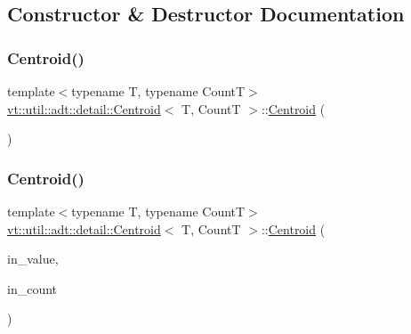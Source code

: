 \subsection{Constructor \& Destructor Documentation}
\mbox{\label{structvt_1_1util_1_1adt_1_1detail_1_1_centroid_a566041829c6432cb574dec14a7686141}} 
\subsubsection{\texorpdfstring{Centroid()}{Centroid()}\hspace{0.1cm}{\footnotesize\ttfamily [1/2]}}
{\footnotesize\ttfamily template$<$typename T, typename CountT$>$ \\
\hyperlink{structvt_1_1util_1_1adt_1_1detail_1_1_centroid}{vt\+::util\+::adt\+::detail\+::\+Centroid}$<$ T, CountT $>$\+::\hyperlink{structvt_1_1util_1_1adt_1_1detail_1_1_centroid}{Centroid} (\begin{DoxyParamCaption}{ }\end{DoxyParamCaption})\hspace{0.3cm}{\ttfamily [default]}}

\mbox{\label{structvt_1_1util_1_1adt_1_1detail_1_1_centroid_a7950a3f8199b064108e117106014b645}} 
\subsubsection{\texorpdfstring{Centroid()}{Centroid()}\hspace{0.1cm}{\footnotesize\ttfamily [2/2]}}
{\footnotesize\ttfamily template$<$typename T, typename CountT$>$ \\
\hyperlink{structvt_1_1util_1_1adt_1_1detail_1_1_centroid}{vt\+::util\+::adt\+::detail\+::\+Centroid}$<$ T, CountT $>$\+::\hyperlink{structvt_1_1util_1_1adt_1_1detail_1_1_centroid}{Centroid} (\begin{DoxyParamCaption}\item[{T}]{in\+\_\+value,  }\item[{\hyperlink{structvt_1_1util_1_1adt_1_1detail_1_1_centroid_ac3815361e4f13eeb8b2863d2eb8db1dd}{Count\+Type}}]{in\+\_\+count }\end{DoxyParamCaption})\hspace{0.3cm}{\ttfamily [inline]}}



